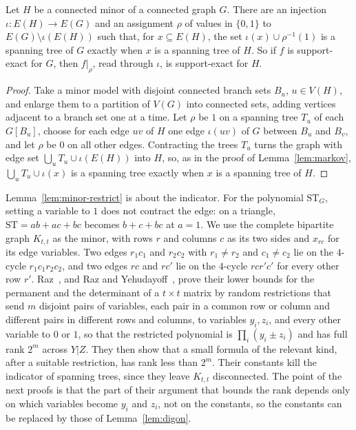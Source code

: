 \begin{lemma}[minors]\label{lem:minor-restrict}
Let $H$ be a connected minor of a connected graph $G$. There are an injection $\iota:E(H)\to E(G)$ and an assignment $\rho$ of values in $\{0,1\}$ to $E(G)\setminus\iota(E(H))$ such that, for $x\subseteq E(H)$, the set $\iota(x)\cup\rho^{-1}(1)$ is a spanning tree of $G$ exactly when $x$ is a spanning tree of $H$. So if $f$ is support-exact for $G$, then $f|_\rho$, read through $\iota$, is support-exact for $H$.
\end{lemma}

\begin{proof}
Take a minor model with disjoint connected branch sets $B_u$, $u\in V(H)$, and enlarge them to a partition of $V(G)$ into connected sets, adding vertices adjacent to a branch set one at a time. Let $\rho$ be $1$ on a spanning tree $T_u$ of each $G[B_u]$, choose for each edge $uv$ of $H$ one edge $\iota(uv)$ of $G$ between $B_u$ and $B_v$, and let $\rho$ be $0$ on all other edges. Contracting the trees $T_u$ turns the graph with edge set $\bigcup_uT_u\cup\iota(E(H))$ into $H$, so, as in the proof of Lemma~\ref{lem:markov}, $\bigcup_uT_u\cup\iota(x)$ is a spanning tree exactly when $x$ is a spanning tree of $H$.
\end{proof}

Lemma~\ref{lem:minor-restrict} is about the indicator. For the polynomial $\mathrm{ST}_G$, setting a variable to $1$ does not contract the edge: on a triangle, $\mathrm{ST}=ab+ac+bc$ becomes $b+c+bc$ at $a=1$. We use the complete bipartite graph $K_{t,t}$ as the minor, with rows $r$ and columns $c$ as its two sides and $x_{rc}$ for its edge variables. Two edges $r_1c_1$ and $r_2c_2$ with $r_1\ne r_2$ and $c_1\ne c_2$ lie on the $4$-cycle $r_1c_1r_2c_2$, and two edges $rc$ and $rc'$ lie on the $4$-cycle $rcr'c'$ for every other row $r'$. Raz~\cite{Raz09}, and Raz and Yehudayoff~\cite{RazYehudayoff09}, prove their lower bounds for the permanent and the determinant of a $t\times t$ matrix by random restrictions that send $m$ disjoint pairs of variables, each pair in a common row or column and different pairs in different rows and columns, to variables $y_i,z_i$, and every other variable to $0$ or $1$, so that the restricted polynomial is $\prod_i(y_i\pm z_i)$ and has full rank $2^m$ across $Y|Z$. They then show that a small formula of the relevant kind, after a suitable restriction, has rank less than $2^m$. Their constants kill the indicator of spanning trees, since they leave $K_{t,t}$ disconnected. The point of the next proofs is that the part of their argument that bounds the rank depends only on which variables become $y_i$ and $z_i$, not on the constants, so the constants can be replaced by those of Lemma~\ref{lem:digon}.

